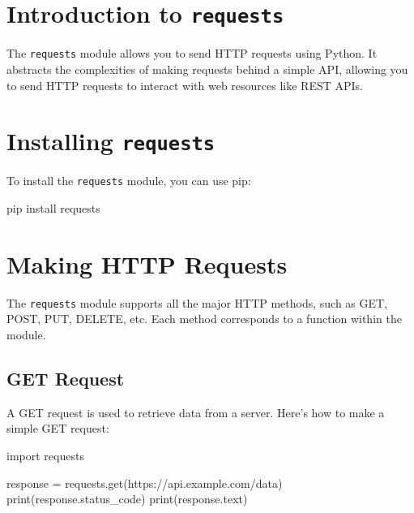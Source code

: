 \documentclass[
  letterpaper,
  DIV=11,
  numbers=noendperiod]{scrreprt}
\newenvironment{Shaded}{\begin{snugshade}}{\end{snugshade}}
\newcommand{\BuiltInTok}[1]{\textcolor[rgb]{0.00,0.23,0.31}{#1}}
\newcommand{\ExtensionTok}[1]{\textcolor[rgb]{0.00,0.23,0.31}{#1}}
\newcommand{\ImportTok}[1]{\textcolor[rgb]{0.00,0.46,0.62}{#1}}
\newcommand{\NormalTok}[1]{\textcolor[rgb]{0.00,0.23,0.31}{#1}}
\newcommand{\OperatorTok}[1]{\textcolor[rgb]{0.37,0.37,0.37}{#1}}
\newcommand{\StringTok}[1]{\textcolor[rgb]{0.13,0.47,0.30}{#1}}
\begin{document}
\section{\texorpdfstring{Introduction to
\texttt{requests}}{Introduction to requests}}\label{introduction-to-requests}

The \texttt{requests} module allows you to send HTTP requests using
Python. It abstracts the complexities of making requests behind a simple
API, allowing you to send HTTP requests to interact with web resources
like REST APIs.

\section{\texorpdfstring{Installing
\texttt{requests}}{Installing requests}}\label{installing-requests}

To install the \texttt{requests} module, you can use pip:

\begin{Shaded}
\begin{Highlighting}[]
\ExtensionTok{pip}\NormalTok{ install requests}
\end{Highlighting}
\end{Shaded}

\section{Making HTTP Requests}\label{making-http-requests}

The \texttt{requests} module supports all the major HTTP methods, such
as GET, POST, PUT, DELETE, etc. Each method corresponds to a function
within the module.

\subsection{GET Request}\label{get-request}

A GET request is used to retrieve data from a server. Here's how to make
a simple GET request:

\begin{Shaded}
\begin{Highlighting}[]
\ImportTok{import}\NormalTok{ requests}

\NormalTok{response }\OperatorTok{=}\NormalTok{ requests.get(}\StringTok{\textquotesingle{}https://api.example.com/data\textquotesingle{}}\NormalTok{)}
\BuiltInTok{print}\NormalTok{(response.status\_code)}
\BuiltInTok{print}\NormalTok{(response.text)}
\end{Highlighting}
\end{Shaded}
\end{document}

